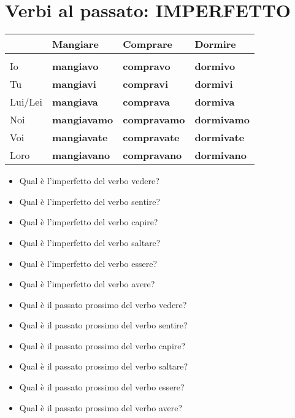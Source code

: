 \documentclass[letter,11pt]{article}
\begin{document}
\vskip 0.2in
\section*{Verbi al passato: IMPERFETTO}
\vskip 0.2in

\begin{tabular}{ |p{2cm}| p{3.5cm}| p{3.5cm}| p{3.5cm}|  }
      & Mangiare & Comprare & Dormire   \\
    \hline
    \hline
     &  &  &  \\ \hline
    Io      & {\bf mangiavo} & {\bf compravo}  & {\bf dormivo}   \\ \hline
    Tu      & {\bf mangiavi} & {\bf compravi} & {\bf dormivi} \\ \hline
    Lui/Lei & {\bf mangiava} & {\bf comprava} & {\bf dormiva}    \\ \hline
    Noi     & {\bf mangiavamo} & {\bf compravamo} & {\bf dormivamo}   \\ \hline
    Voi     & {\bf mangiavate} & {\bf compravate} & {\bf dormivate}   \\ \hline
    Loro    & {\bf mangiavano} & {\bf compravano} & {\bf dormivano}   \\ \hline
    \hline
\end{tabular}

\vskip 0.2in

\begin{multicols}{2}

\begin{itemize}
    \item Qual è l'imperfetto del verbo vedere?
    \item Qual è l'imperfetto del verbo sentire?
    \item Qual è l'imperfetto del verbo capire?
    \item Qual è l'imperfetto del verbo saltare?
    \item Qual è l'imperfetto del verbo essere?
    \item Qual è l'imperfetto del verbo avere?
    \item Qual è il passato prossimo del verbo vedere?
    \item Qual è il passato prossimo del verbo sentire?
    \item Qual è il passato prossimo del verbo capire?
    \item Qual è il passato prossimo del verbo saltare?
    \item Qual è il passato prossimo del verbo essere?
    \item Qual è il passato prossimo del verbo avere?


\end{itemize}
\end{multicols}
\end{document}
